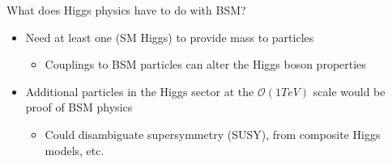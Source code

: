 \begin{frame}
{\begin{block}{What does Higgs physics have to do with BSM?}
\begin{itemize}
			\small
			\item Need at least one (SM Higgs) to provide mass to particles
			\begin{itemize}
				\item Couplings to BSM particles can alter the Higgs boson properties
			\end{itemize}
			\item Additional particles in the Higgs sector at the $\mathcal{O}\left(1 TeV\right)$ scale would be proof of BSM physics
			\begin{itemize}
				\item Could disambiguate supersymmetry (SUSY), from composite Higgs models, etc.
			\end{itemize}
		\end{itemize}
	\end{block}
	}
\end{frame}

